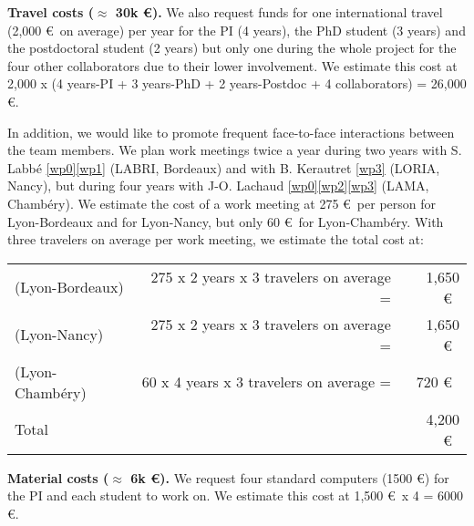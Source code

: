 \textbf{Travel costs ($\approx$ 30k \euro).}
We also request funds for one international travel (2,000 \euro~on average)
per year for the PI (4 years), the PhD student (3 years) and the postdoctoral student (2 years)
but only one during the whole project for the four other collaborators due to their lower involvement.
We estimate this cost at 2,000 x (4 years-PI + 3 years-PhD + 2 years-Postdoc + 4 collaborators) = 26,000 \euro. 

In addition, we would like to promote frequent face-to-face interactions between the team members.
We plan work meetings twice a year during two years with
S. Labb\'{e} \ref{wp0}\ref{wp1} (LABRI, Bordeaux) and
with B. Kerautret \ref{wp3} (LORIA, Nancy),
but during four years
with J-O. Lachaud \ref{wp0}\ref{wp2}\ref{wp3} (LAMA, Chamb\'{e}ry).
We estimate the cost of a work meeting at 275 \euro~per person
for Lyon-Bordeaux and for Lyon-Nancy,
but only 60 \euro~for Lyon-Chamb\'{e}ry.
With three travelers on average per work meeting, we estimate the total cost at:

\begin{tabular}{lrr}
  (Lyon-Bordeaux) & 275 x 2 years x 3 travelers on average =& 1,650 \euro~\\ 
  (Lyon-Nancy) & 275 x 2 years x 3 travelers on average =& 1,650 \euro~\\
  (Lyon-Chamb\'{e}ry) & 60 x 4 years x 3 travelers on average =& 720 \euro~\\
  Total & ~ & 4,200 \euro~\\
\end{tabular}

\textbf{Material costs ($\approx$ 6k \euro).}
We request four standard computers (1500 \euro) for the PI and each student to work on.
We estimate this cost at 1,500 \euro~x 4 = 6000 \euro. 
